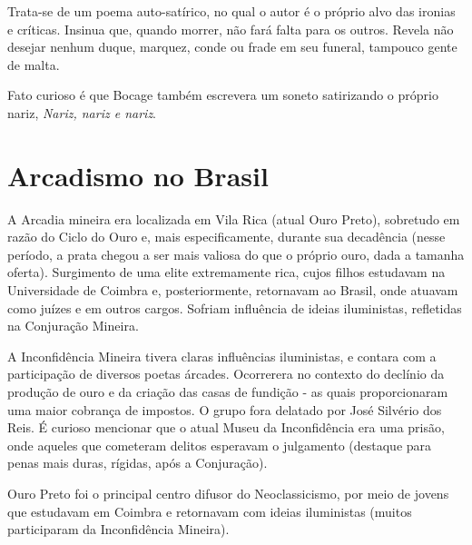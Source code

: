 \documentclass[12pt]{book}
\begin{document}
			\par Trata-se de um poema auto-satírico, no qual o autor é o próprio alvo das ironias e críticas. Insinua que, quando morrer, não fará falta para os outros. Revela não desejar nenhum duque, marquez, conde ou frade em seu funeral, tampouco gente de malta.
			\par Fato curioso é que Bocage também escrevera um soneto satirizando o próprio nariz, \textit{Nariz, nariz e nariz}.
			
		\chapter{Arcadismo no Brasil}
		\par A Arcadia mineira era localizada em Vila Rica (atual Ouro Preto), sobretudo em razão do Ciclo do Ouro e, mais especificamente, durante sua decadência (nesse período, a prata chegou a ser mais valiosa do que o próprio ouro, dada a tamanha oferta). Surgimento de uma elite extremamente rica, cujos filhos estudavam na Universidade de Coimbra e, posteriormente, retornavam ao Brasil, onde atuavam como juízes e em outros cargos. Sofriam influência de ideias iluministas, refletidas na Conjuração Mineira.
		\par A Inconfidência Mineira tivera claras influências iluministas, e contara com a participação de diversos poetas árcades. Ocorrerera no contexto do declínio da produção de ouro e da criação das casas de fundição - as quais proporcionaram uma maior cobrança de impostos. O grupo fora delatado por José Silvério dos Reis. É curioso mencionar que o atual Museu da Inconfidência era uma prisão, onde aqueles que cometeram delitos esperavam o julgamento (destaque para penas mais duras, rígidas, após a Conjuração).
		\par Ouro Preto foi o principal centro difusor do Neoclassicismo, por meio de jovens que estudavam em Coimbra e retornavam com ideias iluministas (muitos participaram da Inconfidência Mineira).
\end{document}
